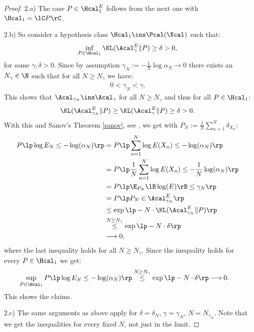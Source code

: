 \begin{Thm}
\begin{proof}
    2.a) The case $P \in \Hcal_1^E$ follows from the next one with $\Hcal_1=\lC P \rC$.

    2.b) So consider a hypothesis class $\Hcal_1 \ins \Pcal(\Xcal)$ such that:
    \begin{align*}
       \inf_{P \in \Hcal_1} \KL(\Acal_\gamma^E \|P) \ge \delta  > 0,
    \end{align*}
    for some  $\gamma,\delta > 0$.
    Since by assumption $\gamma_N:=-\frac{1}{N} \log \alpha_N \to 0$ there exists an $N_\gamma \in \N$ such that for all $N \ge N_\gamma$ we have:
    \begin{align*}
      0 < \gamma_N <  \gamma.
    \end{align*}
    This shows that $\Acal_{\gamma_N} \ins \Acal_{\gamma}$  for all $N \ge N_\gamma$ and thus for all $P \in \Hcal_1$:
    \begin{align*}
        \KL(\Acal_{\gamma_N}^E \|P) \ge  \KL(\Acal_\gamma^E \|P) \ge \delta > 0.
    \end{align*}
    With this and Sanov's Theorem \ref{sanov}, see \cite{Csi84,Bal2020}, we get with $P_N := \frac{1}{N} \sum_{n=1}^N \delta_{X_n}$:
    \begin{align*}
        P\lp  \log E_N \le - \log(\alpha_N)  \rp 
      &=  P\lp   \sum_{n=1}^N  \log E(X_n)  \le - \log(\alpha_N)  \rp  \\
      &=  P\lp   \frac{1}{N}\sum_{n=1}^N  \log E(X_n)  \le - \frac{1}{N} \log(\alpha_N)  \rp  \\
      &=  P\lp  \E_{P_N}\lB \log(E) \rB \le \gamma_N  \rp  \\
      &=  P\lp P_N \in \Acal^E_{\gamma_N}\rp \\ 
      &\le \exp\lp -N \cdot \KL(\Acal^E_{\gamma_N}\|P) \rp \\
      &\stackrel{N\ge N_\gamma}{\le} \exp\lp -N \cdot \delta \rp\\
      & \longrightarrow 0,
    \end{align*}
    where the last inequality holds for all $N \ge N_\gamma$.
    Since the inequality holds for every $P \in \Hcal_1$ we get:
    \begin{align*}
        \sup_{P \in \Hcal_1}   P\lp  \log E_N \le - \log(\alpha_N)  \rp 
      &\stackrel{N\ge N_\gamma}{\le} \exp\lp -N \cdot \delta \rp  \longrightarrow 0.
    \end{align*}
    This shows the claims.

    2.c) The same arguments as above apply for $\delta=\delta_N$, $\gamma=\gamma_N$, $N=N_{\gamma_N}$. Note that we get the inequalities for every fixed $N$, not just in the limit.
 \end{proof}
\end{Thm}

